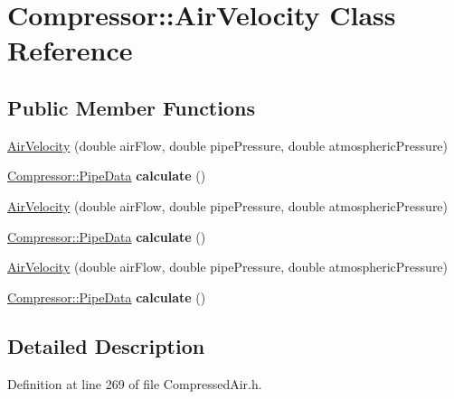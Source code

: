 \hypertarget{class_compressor_1_1_air_velocity}{}\section{Compressor\+:\+:Air\+Velocity Class Reference}
\label{class_compressor_1_1_air_velocity}
\subsection*{Public Member Functions}
\begin{DoxyCompactItemize}
\item 
\hyperlink{class_compressor_1_1_air_velocity_a53449e5354b1e33db644078ce4d92e4b}{Air\+Velocity} (double air\+Flow, double pipe\+Pressure, double atmospheric\+Pressure)
\item 
\mbox{\label{class_compressor_1_1_air_velocity_af17f62700c50a692b4a0db98a11c880c}} 
\hyperlink{struct_compressor_1_1_pipe_data}{Compressor\+::\+Pipe\+Data} {\bfseries calculate} ()
\item 
\hyperlink{class_compressor_1_1_air_velocity_a53449e5354b1e33db644078ce4d92e4b}{Air\+Velocity} (double air\+Flow, double pipe\+Pressure, double atmospheric\+Pressure)
\item 
\mbox{\label{class_compressor_1_1_air_velocity_af17f62700c50a692b4a0db98a11c880c}} 
\hyperlink{struct_compressor_1_1_pipe_data}{Compressor\+::\+Pipe\+Data} {\bfseries calculate} ()
\item 
\hyperlink{class_compressor_1_1_air_velocity_a53449e5354b1e33db644078ce4d92e4b}{Air\+Velocity} (double air\+Flow, double pipe\+Pressure, double atmospheric\+Pressure)
\item 
\mbox{\label{class_compressor_1_1_air_velocity_af17f62700c50a692b4a0db98a11c880c}} 
\hyperlink{struct_compressor_1_1_pipe_data}{Compressor\+::\+Pipe\+Data} {\bfseries calculate} ()
\end{DoxyCompactItemize}


\subsection{Detailed Description}


Definition at line 269 of file Compressed\+Air.\+h.



